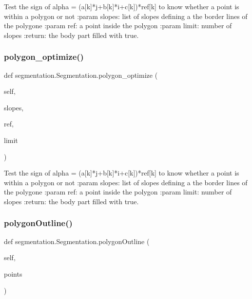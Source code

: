 \begin{DoxyVerb}Test the sign of alpha = (a[k]*j+b[k]*i+c[k])*ref[k]
to know whether a point is within a polygon or not
:param slopes: list of slopes defining a the border lines of the polygone
:param ref:  a point inside the polygon
:param limit: number of slopes
:return: the body part filled with true.
\end{DoxyVerb}
 \mbox{\label{classsegmentation_1_1_segmentation_a3fe70a2d840350c65e39d2f3938826bf}} 
\subsubsection{\texorpdfstring{polygon\+\_\+optimize()}{polygon\_optimize()}}
{\footnotesize\ttfamily def segmentation.\+Segmentation.\+polygon\+\_\+optimize (\begin{DoxyParamCaption}\item[{}]{self,  }\item[{}]{slopes,  }\item[{}]{ref,  }\item[{}]{limit }\end{DoxyParamCaption})}

\begin{DoxyVerb}Test the sign of alpha = (a[k]*j+b[k]*i+c[k])*ref[k]
to know whether a point is within a polygon or not
:param slopes: list of slopes defining a the border lines of the polygone
:param ref:  a point inside the polygon
:param limit: number of slopes
:return: the body part filled with true.
\end{DoxyVerb}
 \mbox{\label{classsegmentation_1_1_segmentation_a13657232294fa4956ad7426d18ebfab4}} 
\subsubsection{\texorpdfstring{polygon\+Outline()}{polygonOutline()}}
{\footnotesize\ttfamily def segmentation.\+Segmentation.\+polygon\+Outline (\begin{DoxyParamCaption}\item[{}]{self,  }\item[{}]{points }\end{DoxyParamCaption})}

